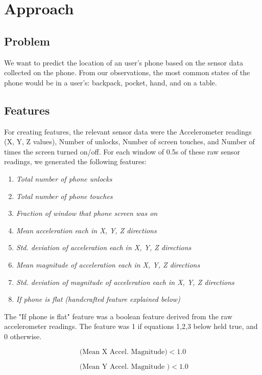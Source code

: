 \section{Approach}

\subsection{Problem}
We want to predict the location of an user's phone based on the sensor data collected on the phone. 
From our observations, the most common states of the phone would be in a user's: backpack, pocket, hand, and on a table. 

\subsection{Features}
For creating features, the relevant sensor data were the Accelerometer readings (X, Y, Z values), Number of unlocks, Number of screen touches, and Number of times the screen turned on/off. For each window of 0.5s of these raw sensor readings, we generated the following features:

\begin{enumerate}
\item \textit{Total number of phone unlocks}
\item \textit{Total number of phone touches}
\item \textit{Fraction of window that phone screen was on}
\item \textit{Mean acceleration each in X, Y, Z directions}
\item \textit{Std. deviation of acceleration each in X, Y, Z directions}
\item \textit{Mean magnitude of acceleration each in X, Y, Z directions}
\item \textit{Std. deviation of magnitude of acceleration each in X, Y, Z directions}
\item \textit{If phone is flat (handcrafted feature explained below)}
\end{enumerate}

The "If phone is flat" feature was a boolean feature derived from the raw accelerometer readings. 
The feature was 1 if equations 1,2,3 below held true, and 0 otherwise.

\begin{equation}\label{eq1}
    \text{(Mean X Accel. Magnitude)} < 1.0 
\end{equation}


\begin{equation}\label{eq2}
\text{ (Mean Y Accel. Magnitude )} < 1.0
\end{equation}

